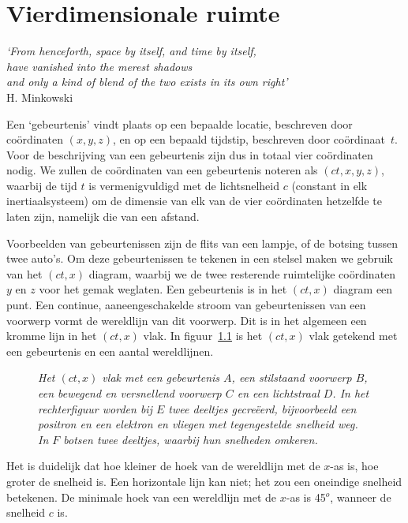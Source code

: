 \chapter{Vierdimensionale ruimte}
\vspace{-1cm}\begin{flushright}
{\it `From henceforth, space by itself, and time by itself, \\ have vanished into the merest shadows \\ and only a kind of blend of the two exists in its own right'} \\ H. Minkowski
\end{flushright}
Een `gebeurtenis' vindt plaats op een bepaalde locatie, beschreven door
co\"ordinaten $(x,y,z)$, en op een bepaald tijdstip, beschreven door
co\"ordinaat~$t$. Voor de beschrijving van een gebeurtenis zijn dus in
totaal vier co\"ordinaten nodig. We zullen de co\"ordinaten van een
gebeurtenis noteren als $(ct,x,y,z)$, waarbij de tijd $t$ is
vermenigvuldigd met de lichtsnelheid $c$ (constant in elk
inertiaalsysteem) om de dimensie van elk van de vier co\"ordinaten
hetzelfde te laten zijn, namelijk die van een afstand.

Voorbeelden van gebeurtenissen zijn de flits van een lampje, of de
botsing tussen twee auto's. Om deze gebeurtenissen te tekenen in een
stelsel maken we gebruik van het $(ct,x)$ diagram, waarbij we de twee
resterende ruimtelijke co\"ordinaten $y$ en $z$ voor het gemak
weglaten. Een gebeurtenis is in het $(ct,x)$ diagram een punt. Een
continue, aaneengeschakelde stroom van gebeurtenissen van een voorwerp
vormt de wereldlijn van dit voorwerp. Dit is in het algemeen een
kromme lijn in het $(ct,x)$ vlak. In figuur~\ref{f:grid0} is het
$(ct,x)$ vlak getekend met een gebeurtenis en een aantal wereldlijnen.

\begin{figure}[ht] 
\centering
\caption{{\sl \label{f:grid0} Het $(ct,x)$ vlak met een gebeurtenis
$A$, een stilstaand voorwerp $B$, een bewegend en versnellend voorwerp
$C$ en een lichtstraal $D$. In het rechterfiguur worden bij $E$ twee
deeltjes gecre\"eerd, bijvoorbeeld een positron en een elektron en
vliegen met tegengestelde snelheid weg. In $F$ botsen twee deeltjes,
waarbij hun snelheden omkeren.}}
\end{figure}

Het is duidelijk dat hoe kleiner de hoek van de wereldlijn met de
$x$-as is, hoe groter de snelheid is. Een horizontale lijn kan niet;
het zou een oneindige snelheid betekenen. De minimale hoek van een
wereldlijn met de $x$-as is 45$^o$, wanneer de snelheid $c$ is.


